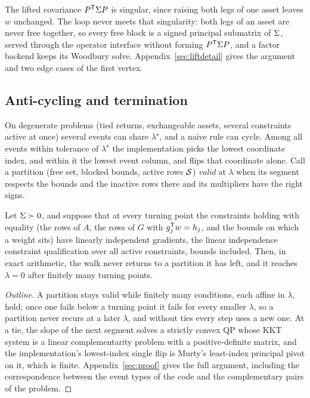 The lifted covariance $P^{\mathsf{T}}\Sigma P$ is singular, since raising both legs of one
asset leaves $w$ unchanged. The loop never meets that singularity: both legs of an asset
are never free together, so every free block is a signed principal submatrix of $\Sigma$,
served through the operator interface without forming $P^{\mathsf{T}}\Sigma P$, and a factor
backend keeps its Woodbury solve. Appendix~\ref{sec:liftdetail} gives the argument and
two edge cases of the first vertex.

\subsection{Anti-cycling and termination}
\label{sec:bland}

On degenerate problems (tied returns, exchangeable assets, several constraints active at
once) several events can share $\lambda^{\star}$, and a naive rule can cycle. Among all
events within tolerance of $\lambda^{\star}$ the implementation picks the lowest
coordinate index, and within it the lowest event column, and flips that coordinate
alone. Call a partition (free set, blocked bounds, active rows $\mathcal{S}$) \emph{valid} at
$\lambda$ when its segment respects the bounds and the inactive rows there and its
multipliers have the right signs.

\begin{proposition}\label{prop:termination}
Let $\Sigma \succ 0$, and suppose that at every turning point the constraints holding
with equality (the rows of $A$, the rows of $G$ with $g_j^{\mathsf{T}} w = h_j$, and the
bounds on which a weight sits) have linearly independent gradients, the linear independence
constraint qualification over all active constraints, bounds included. Then, in exact
arithmetic, the walk never returns to a partition it has left, and it reaches
$\lambda = 0$ after finitely many turning points.
\end{proposition}

\begin{proof}[Outline]
A partition stays valid while finitely many conditions, each affine in $\lambda$,
hold; once one fails below a turning point it fails for every smaller $\lambda$, so a
partition never recurs at a later $\lambda$, and without ties every step uses a new one.
At a tie, the slope of the next segment solves a strictly convex QP whose KKT system is a
linear complementarity problem with a positive-definite matrix, and the implementation's
lowest-index single flip is Murty's least-index principal pivot on it, which is finite.
Appendix~\ref{sec:proof} gives the full argument, including the correspondence between
the event types of the code and the complementary pairs of the problem.
\end{proof}

